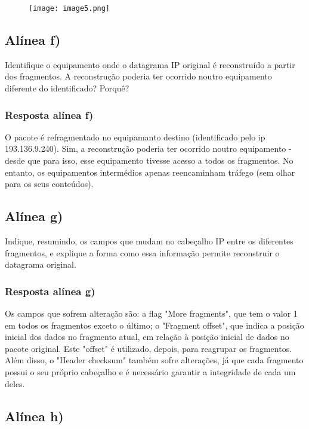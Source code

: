 \documentclass{article}
\begin{document}
\begin{figure}[h]
    \centering
    \texttt{[image: image5.png]}
\end{figure}


\subsection{Alínea f)}

Identifique o equipamento onde o datagrama IP original é reconstruído a partir dos fragmentos. A reconstrução
poderia ter ocorrido noutro equipamento diferente do identificado? Porquê?

\subsubsection{Resposta alínea f)}

O pacote é refragmentado no equipamanto destino (identificado pelo ip 193.136.9.240). Sim, a reconstrução poderia ter ocorrido noutro equipamento - desde que para isso, esse equipamento tivesse acesso a todos os fragmentos. No entanto, os equipamentos intermédios apenas reencaminham tráfego (sem olhar para os seus conteúdos).

\subsection{Alínea g)}

Indique, resumindo, os campos que mudam no cabeçalho IP entre os diferentes fragmentos, e explique a forma
como essa informação permite reconstruir o datagrama original.

\subsubsection{Resposta alínea g)}

Os campos que sofrem alteração são: a flag "More fragments", que tem o valor 1 em todos os fragmentos exceto o último; o "Fragment offset", que indica a posição inicial dos dados no fragmento atual, em relação à posição inicial de dados no pacote original. Este "offset" é utilizado, depois, para reagrupar os fragmentos. Além disso, o "Header checksum" também sofre alterações, já que cada fragmento possui o seu próprio cabeçalho e é necessário garantir a integridade de cada um deles.

\subsection{Alínea h)}
\end{document}
